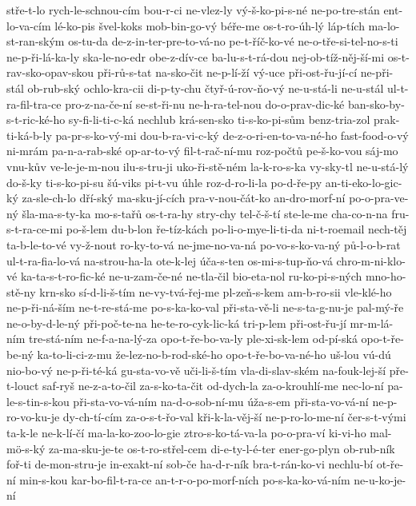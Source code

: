 stře-t-lo
rych-le-schnou-cím
bou-r-ci
ne-vlez-ly
vý-š-ko-pi-s-né
ne-po-tre-stán
ent-lo-va-cím
lé-ko-pis
švel-koks
mob-bin-go-vý
béře-me
os-t-ro-úh-lý
láp-tích
ma-lo-st-ran-ským
os-tu-da
de-z-in-ter-pre-to-vá-no
pe-t-říč-ko-vé
ne-o-tře-si-tel-no-s-ti
ne-p-ři-lá-ka-ly
ska-le-no-edr
obe-z-dív-ce
ba-lu-s-t-rá-dou
nej-ob-tíž-něj-ší-mi
os-t-rav-sko-opav-skou
při-rů-s-tat
na-sko-čit
ne-p-lí-ží
vý-uce
při-ost-řu-jí-cí
ne-při-stál
ob-rub-ský
ochlo-kra-cii
di-p-ty-chu
čtyř-ú-rov-ňo-vý
ne-u-stá-li
ne-u-stál
ul-t-ra-fil-tra-ce
pro-z-na-če-ní
se-st-ři-nu
ne-h-ra-tel-nou
do-o-prav-dic-ké
ban-sko-by-s-t-ric-ké-ho
sy-fi-li-ti-c-ká
nechlub
krá-sen-sko
ti-s-ko-pi-sům
benz-tria-zol
prak-ti-ká-b-ly
pa-pr-s-ko-vý-mi
dou-b-ra-vi-c-ký
de-z-o-ri-en-to-va-né-ho
fast-food-o-vý
ni-mrám
pa-n-a-rab-ské
op-ar-to-vý
fil-t-rač-ní-mu
roz-počtů
pe-š-ko-vou
sáj-mo
vnu-kův
ve-le-je-m-nou
ilu-s-tru-ji
uko-ři-stě-ném
la-k-ro-s-ka
vy-sky-tl
ne-u-stá-lý
do-š-ky
ti-s-ko-pi-su
šú-viks
pi-t-vu
úhle
roz-d-ro-li-la
po-d-ře-py
an-ti-eko-lo-gic-ký
za-sle-ch-lo
dří-ský
ma-sku-jí-cích
pra-v-nou-čát-ko
an-dro-morf-ní
po-o-pra-ve-ný
šla-ma-s-ty-ka
mo-s-tařů
os-t-ra-hy
stry-chy
tel-č-š-tí
ste-le-me
cha-co-n-na
fru-s-t-ra-ce-mi
po-š-lem
du-b-lon
ře-tíz-kách
po-li-o-mye-li-ti-da
ni-t-roemail
nech-těj
ta-b-le-to-vé
vy-ž-nout
ro-ky-to-vá
ne-jme-no-va-ná
po-vo-s-ko-va-ný
pů-l-o-b-rat
ul-t-ra-fia-lo-vá
na-strou-ha-la
ote-k-lej
úča-s-ten
os-mi-s-tup-ňo-vá
chro-m-ni-klo-vé
ka-ta-s-t-ro-fic-ké
ne-u-zam-če-né
ne-tla-čil
bio-eta-nol
ru-ko-pi-s-ných
mno-ho-stě-ny
krn-sko
sí-d-li-š-tím
ne-vy-tvá-řej-me
pl-zeň-s-kem
am-b-ro-sii
vle-klé-ho
ne-p-ři-ná-ším
ne-t-re-stá-me
po-s-ka-ko-val
při-sta-vě-li
ne-s-ta-g-nu-je
pal-mý-ře
ne-o-by-d-le-ný
při-poč-te-na
he-te-ro-cyk-lic-ká
tri-p-lem
při-ost-řu-jí
mr-m-lá-ním
tre-stá-ním
ne-f-a-na-lý-za
opo-t-ře-bo-va-ly
ple-xi-sk-lem
od-pí-ská
opo-t-ře-be-ný
ka-to-li-ci-z-mu
že-lez-no-b-rod-ské-ho
opo-t-ře-bo-va-né-ho
uš-lou
vú-dú
nio-bo-vý
ne-p-ři-té-ká
gu-sta-vo-vě
uči-li-š-tím
vla-di-slav-ském
na-fouk-lej-ší
pře-t-louct
saf-ryš
ne-z-a-to-čil
za-s-ko-ta-čit
od-dych-la
za-o-krouhlí-me
nec-lo-ní
pa-le-s-tin-s-kou
při-sta-vo-vá-ním
na-d-o-sob-ní-mu
úža-s-em
při-sta-vo-vá-ní
ne-p-ro-vo-ku-je
dy-ch-tí-cím
za-o-s-t-řo-val
kři-k-la-věj-ší
ne-p-ro-lo-me-ní
čer-s-t-vými
ta-k-le
ne-k-lí-čí
ma-la-ko-zoo-lo-gie
ztro-s-ko-tá-va-la
po-o-pra-ví
ki-vi-ho
mal-mö-s-ký
za-ma-sku-je-te
os-t-ro-střel-cem
di-e-ty-l-é-ter
ener-go-plyn
ob-rub-ník
foř-ti
de-mon-stru-je
in-exakt-ní
sob-če
ha-d-r-ník
bra-t-rán-ko-vi
nechlu-bí
ot-ře-ní
min-s-kou
kar-bo-fil-t-ra-ce
an-t-r-o-po-morf-ních
po-s-ka-ko-vá-ním
ne-u-ko-je-ní
